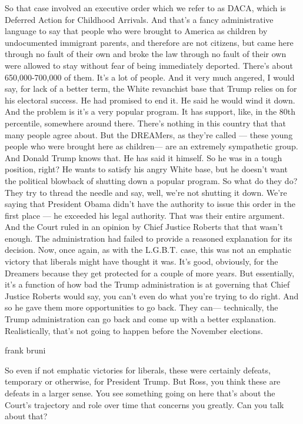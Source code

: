 So that case involved an executive order which we refer to as DACA,
which is Deferred Action for Childhood Arrivals. And that's a fancy
administrative language to say that people who were brought to America
as children by undocumented immigrant parents, and therefore are not
citizens, but came here through no fault of their own and broke the law
through no fault of their own were allowed to stay without fear of being
immediately deported. There's about 650,000-700,000 of them. It's a lot
of people. And it very much angered, I would say, for lack of a better
term, the White revanchist base that Trump relies on for his electoral
success. He had promised to end it. He said he would wind it down. And
the problem is it's a very popular program. It has support, like, in the
80th percentile, somewhere around there. There's nothing in this country
that that many people agree about. But the DREAMers, as they're called
--- these young people who were brought here as children--- are an
extremely sympathetic group. And Donald Trump knows that. He has said it
himself. So he was in a tough position, right? He wants to satisfy his
angry White base, but he doesn't want the political blowback of shutting
down a popular program. So what do they do? They try to thread the
needle and say, well, we're not shutting it down. We're saying that
President Obama didn't have the authority to issue this order in the
first place --- he exceeded his legal authority. That was their entire
argument. And the Court ruled in an opinion by Chief Justice Roberts
that that wasn't enough. The administration had failed to provide a
reasoned explanation for its decision. Now, once again, as with the
L.G.B.T. case, this was not an emphatic victory that liberals might have
thought it was. It's good, obviously, for the Dreamers because they get
protected for a couple of more years. But essentially, it's a function
of how bad the Trump administration is at governing that Chief Justice
Roberts would say, you can't even do what you're trying to do right. And
so he gave them more opportunities to go back. They can--- technically,
the Trump administration can go back and come up with a better
explanation. Realistically, that's not going to happen before the
November elections.

frank bruni

So even if not emphatic victories for liberals, these were certainly
defeats, temporary or otherwise, for President Trump. But Ross, you
think these are defeats in a larger sense. You see something going on
here that's about the Court's trajectory and role over time that
concerns you greatly. Can you talk about that?

